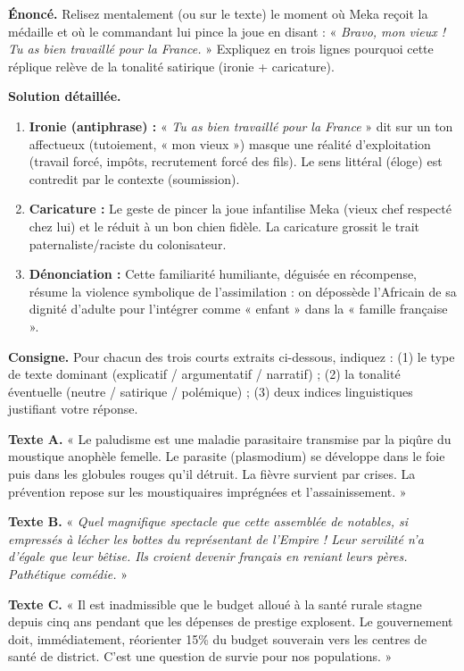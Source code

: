 \documentclass[11pt]{article}
\begin{document}
\begin{exoresolu}
\textbf{Énoncé.} Relisez mentalement (ou sur le texte) le moment où Meka reçoit la médaille et où le commandant lui pince la joue en disant : « \textit{Bravo, mon vieux ! Tu as bien travaillé pour la France.} » Expliquez en trois lignes pourquoi cette réplique relève de la tonalité satirique (ironie + caricature).

\textbf{Solution détaillée.}
\begin{enumerate}
    \item \textbf{Ironie (antiphrase) :} « \textit{Tu as bien travaillé pour la France} » dit sur un ton affectueux (tutoiement, « mon vieux ») masque une réalité d'exploitation (travail forcé, impôts, recrutement forcé des fils). Le sens littéral (éloge) est contredit par le contexte (soumission).
    \item \textbf{Caricature :} Le geste de pincer la joue infantilise Meka (vieux chef respecté chez lui) et le réduit à un bon chien fidèle. La caricature grossit le trait paternaliste/raciste du colonisateur.
    \item \textbf{Dénonciation :} Cette familiarité humiliante, déguisée en récompense, résume la violence symbolique de l'assimilation : on dépossède l'Africain de sa dignité d'adulte pour l'intégrer comme « enfant » dans la « famille française ».
\end{enumerate}
\end{exoresolu}

\begin{exercice}
\textbf{Consigne.} Pour chacun des trois courts extraits ci-dessous, indiquez : (1) le type de texte dominant (explicatif / argumentatif / narratif) ; (2) la tonalité éventuelle (neutre / satirique / polémique) ; (3) deux indices linguistiques justifiant votre réponse.

\textbf{Texte A.} « Le paludisme est une maladie parasitaire transmise par la piqûre du moustique anophèle femelle. Le parasite (plasmodium) se développe dans le foie puis dans les globules rouges qu'il détruit. La fièvre survient par crises. La prévention repose sur les moustiquaires imprégnées et l'assainissement. »

\textbf{Texte B.} « \textit{Quel magnifique spectacle que cette assemblée de notables, si empressés à lécher les bottes du représentant de l'Empire ! Leur servilité n'a d'égale que leur bêtise. Ils croient devenir français en reniant leurs pères. Pathétique comédie.} »

\textbf{Texte C.} « Il est inadmissible que le budget alloué à la santé rurale stagne depuis cinq ans pendant que les dépenses de prestige explosent. Le gouvernement doit, immédiatement, réorienter 15\% du budget souverain vers les centres de santé de district. C'est une question de survie pour nos populations. »
\end{exercice}
\end{document}
